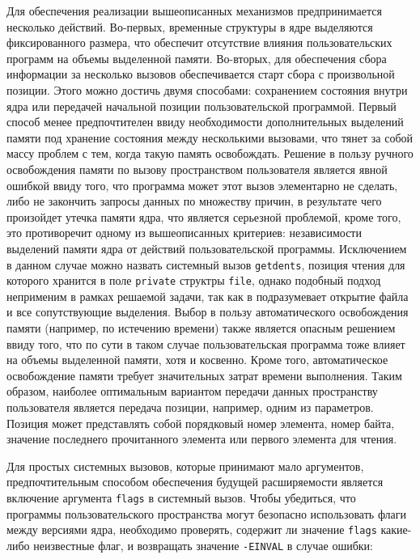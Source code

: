 Для обеспечения реализации вышеописанных механизмов предпринимается несколько
действий. Во-первых, временные структуры в ядре выделяются фиксированного
размера, что обеспечит отсутствие влияния пользовательских программ на объемы
выделенной памяти. Во-вторых, для обеспечения сбора информации за несколько
вызовов обеспечивается старт сбора с произвольной позиции. Этого можно достичь
двумя способами: сохранением состояния внутри ядра или передачей начальной
позиции пользовательской программой. Первый способ менее предпочтителен ввиду
необходимости дополнительных выделений памяти под хранение состояния между
несколькими вызовами, что тянет за собой массу проблем с тем, когда такую память
освобождать. Решение в пользу ручного освобождения памяти по вызову
пространством пользователя является явной ошибкой ввиду того, что программа
может этот вызов элементарно не сделать, либо не закончить запросы данных по
множеству причин, в результате чего произойдет утечка памяти ядра, что является
серьезной проблемой, кроме того, это противоречит одному из вышеописанных
критериев: независимости выделений памяти ядра от действий пользовательской
программы. Исключением в данном случае можно назвать системный вызов
\texttt{getdents}, позиция чтения для которого хранится в поле \texttt{private}
структры \texttt{file}, однако подобный подход неприменим в рамках решаемой
задачи, так как в подразумевает открытие файла и все сопутствующие выделения.
Выбор в пользу автоматического освобождения памяти (например, по
истечению времени) также является опасным решением ввиду того, что по сути в
таком случае пользовательская программа тоже влияет на объемы выделенной памяти,
хотя и косвенно. Кроме того, автоматическое освобождение памяти требует
значительных затрат времени выполнения. Таким образом, наиболее оптимальным
вариантом передачи данных пространству пользователя является передача позиции,
например, одним из параметров. Позиция может представлять собой порядковый номер
элемента, номер байта, значение последнего прочитанного элемента или первого
элемента для чтения.

Для простых системных вызовов, которые принимают мало аргументов,
предпочтительным способом обеспечения будущей расширяемости является включение
аргумента \texttt{flags} в системный вызов. Чтобы убедиться, что программы
пользовательского пространства могут безопасно использовать флаги между версиями
ядра, необходимо проверять, содержит ли значение \texttt{flags} какие-либо
неизвестные флаг, и возвращать значение \texttt{-EINVAL} в случае ошибки:


